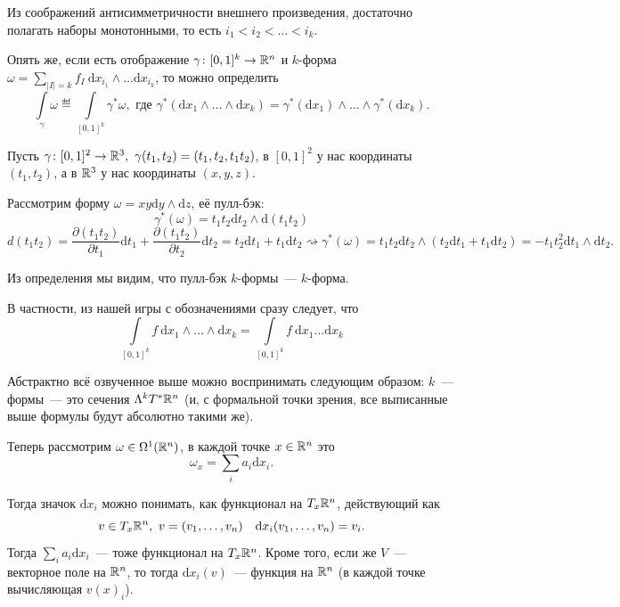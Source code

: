 	Из соображений антисимметричности внешнего произведения, достаточно полагать наборы монотонными, то есть $i_{1} < i_{2} < \ldots < i_{k}$. 

	Опять же, если есть отображение $\gamma\colon [0, 1]^k \to \mathbb{R}^n$ и $k$-форма $\omega = \sum_{|I| = k} f_{I} \ \mathrm{d}x_{i_{1}} \wedge \ldots \mathrm{d}x_{i_{k}}$, то можно определить 
	\[
		\int\limits_{\gamma} \omega \eqdef \int\limits_{[0, 1]^k} \gamma^* \omega, \text{ где } \gamma^{*}(\mathrm{d}x_1 \wedge \ldots \wedge \mathrm{d}x_k) = \gamma^*(\mathrm{d}x_1) \wedge \ldots \wedge \gamma^*(\mathrm{d}x_k).
	\]

	\begin{example}
		Пусть $\gamma\colon [0, 1]^2 \to \R^3, \ \gamma(t_1, t_2) = (t_1, t_2, t_1 t_2)$, в $[0, 1]^2$ у нас координаты $(t_1, t_2)$, а в $\mathbb{R}^3$ у нас координаты $(x, y, z)$.

		Рассмотрим форму $\omega = xy \mathrm{d}y \wedge \mathrm{d}z$, её пулл-бэк: 
		\[
			\gamma^*(\omega) = t_1 t_2 \mathrm{d}t_2 \wedge \mathrm{d}(t_1 t_2)
		\]
		\[
			d(t_1 t_2) = \frac{\partial(t_1 t_2) }{\partial t_1} \mathrm{d}t_1 + \frac{\partial(t_1 t_2) }{\partial t_2} \mathrm{d}t_2 = t_{2} \mathrm{d}t_1 + t_{1}\mathrm{d}t_2 \rightsquigarrow \gamma^*(\omega) = t_1 t_2 \mathrm{d}t_2 \wedge (t_2 \mathrm{d}t_1 + t_1 \mathrm{d}t_2) = -t_1 t_2^2 \mathrm{d}t_1 \wedge \mathrm{d}t_2.
		\]
		
	\end{example}

	\begin{remark}
		Из определения мы видим, что пулл-бэк $k$-формы~--- $k$-форма. 
	\end{remark}

	В частности, из нашей игры с обозначениями сразу следует, что 
	\[
		\int\limits_{[0, 1]^k} f\ \mathrm{d}x_{1} \wedge \ldots \wedge \mathrm{d}x_{k} = \int\limits_{[0, 1]^k} f \  \mathrm{d}x_{1}  \ldots \mathrm{d}x_{k}
	\]

	Абстрактно всё озвученное выше можно воспринимать следующим образом:  $k$~--- формы~--- это сечения $\Lambda^k T^* \mathbb{R}^n$ (и, с формальной точки зрения, все выписанные выше формулы будут абсолютно такими же). 


	Теперь рассмотрим $\omega \in \Omega^1(\mathbb{R}^n)$, в каждой точке $x \in \mathbb{R}^n$ это 
	\[
		\omega_x = \sum_{i} a_{i} \mathrm{d}x_{i}.
	\]

	Тогда значок $\mathrm{d}x_i$ можно понимать, как функционал на $T_{x}\mathbb{R}^n$, действующий как 
	\[
		v \in T_{x}\mathbb{R}^n, \ v = (v_1, \ldots, v_n) \quad \mathrm{d}x_i(v_1, \ldots, v_n) = v_i. 
	\]
	Тогда $\sum_{i} a_{i} \mathrm{d}x_i$~--- тоже функционал на $T_{x}\mathbb{R}^n$. Кроме того, если же $V$~--- векторное поле на $\mathbb{R}^n$, то тогда $\mathrm{d}x_i(v)$~--- функция на $\mathbb{R}^n$ (в каждой точке вычисляющая $v(x)_{i}$).

